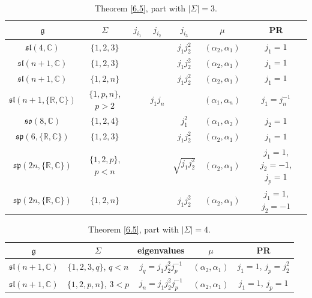 \documentclass[pdftex]{sigma}
\newcommand{\Si}{\Sigma}
\newcommand{\fg}{\mathfrak g}
\numberwithin{equation}{section}
\begin{document}
\begin{table}[th!]\centering\caption{Theorem \ref{6.5}, part with $|\Si|=3$.}\label{ahs8}\vspace{1mm}

\begin{tabular}{|c|c|c|c|c|c|c|}
\hline
$\fg$ & $\Sigma$ & $j_{i_1}$& $j_{i_2}$& $j_{i_3}$&$\mu$&PR \\
\hline
\hline
$\mathfrak{sl}(4,\mathbb{C})$ &$\{1,2,3\}$& & & $j_1j_2^2 $ &$(\alpha_2,\alpha_1)$& $j_1=1$ \\
\hline
$\mathfrak{sl}(n+1,\mathbb{C})$ &$\{1,2,3\}$& & & $j_1j_2^2 $ &$(\alpha_2,\alpha_1)$& $j_1=1$ \\
\hline
$\mathfrak{sl}(n+1,\mathbb{C})$ &$\{1,2,n\}$& & & $j_1j_2^2 $ &$(\alpha_2,\alpha_1)$& $j_1=1$ \\
\hline
$\mathfrak{sl}(n+1,\{\mathbb{R, C}\})$&$\{1,p,n\}$, $p>2$ && $j_1j_n$& &$(\alpha_1,\alpha_n)$&$j_1=j_n^{-1}$ \\
\hline
$\mathfrak{so}(8,\mathbb{C})$& $\{1,2,4\}$&&& $j_1^2 $&$(\alpha_1,\alpha_2)$& $j_2=1$\\
\hline
$\mathfrak{sp}(6,\{\mathbb{R, C}\})$&$\{1,2,3\}$&&& $j_1j_2^2 $&$(\alpha_2,\alpha_1)$ &$j_1=1$\\
\hline
$\mathfrak{sp}(2n,\{\mathbb{R, C}\})$&$\{1,2,p\}$, $p<n$&& & $\sqrt{j_1j_2^2} $&$(\alpha_2,\alpha_1)$&$j_1=1$, $j_2=-1$, $j_p=1$ \\
\hline
$\mathfrak{sp}(2n,\{\mathbb{R, C}\})$&$\{1,2,n\}$&&& $j_1j_2^2 $&$(\alpha_2,\alpha_1)$ &$j_1=1$, $j_2=-1$\\
\hline
\end{tabular}
\end{table}

\begin{table}[th!]\centering\caption{Theorem \ref{6.5}, part with $|\Si|=4$.}\label{ahs9}\vspace{1mm}

\begin{tabular}{|c|c|c|c|c|}
\hline
$\fg$ & $\Sigma$ & eigenvalues& $\mu$& PR \\
\hline
\hline
$\mathfrak{sl}(n+1,\mathbb{C})$ & $\{1,2,3,q\}$, $q<n$&$j_q=j_1j_2^2j_p^{-1}$&$(\alpha_2,\alpha_1)$& $j_1=1$, $j_p=j_2^2$\\
\hline
$\mathfrak{sl}(n+1,\mathbb{C})$ & $\{1,2,p,n\}$, $3<p$&$j_n=j_1j_2^2j_p^{-1}$&$(\alpha_2,\alpha_1)$& $j_1=1$, $j_p=1$\\
\hline
\end{tabular}
\end{table}
\end{document}

